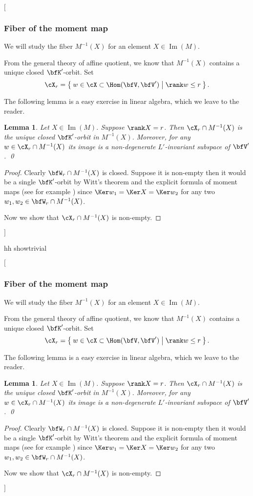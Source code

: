 \documentclass[12pt,a4paper]{amsart}
\newcommand{\trivial}[2][]{\if\relax\detokenize{#1}\relax
  {%
      \color{orange} \vspace{0em} $[$  #2 $]$
      \color{black}
  }
  \else
\ifx#1h
\ifcsname showtrivial\endcsname
{%
    \color{orange} \vspace{0em}  $[$ #2 $]$
    \color{black}
}
\fi
\else {\red Wrong argument!} \fi
\fi
}
\def\Im{\operatorname{Im}}
\numberwithin{equation}{section}
\newtheorem{lem}[thm]{Lemma}
\theoremstyle{remark}
\def\MMP{M}
\begin{document}
\trivial[h]{
\subsubsection{Fiber of the moment map}\label{sec:F.M}

We will study the fiber $M^{-1}(X)$ for an element $X\in \Im(M)$. %

From the general theory of affine quotient, we know that
  $M^{-1}(X)$ contains a unique closed $\bfK'$-orbit.
Set
\[
\cX_r = \Set{w\in \cX\subset \Hom(\bfV,\bfV')| \rank w\leq r}.
\]

The following lemma is a easy exercise in linear algebra, which we leave to the reader.
\begin{lem}\label{lem:F.cl}
Let $X\in\Im(\MMP)$. Suppose $\rank X = r$.
Then $\cX_r\cap \MMP^{-1}(X)$ is the unique closed $\bfK'$-orbit in $\MMP^{-1}(X)$.
Moreover, for any $w\in \cX_r\cap \MMP^{-1}(X)$ its image is a non-degenerate
$L'$-invariant subspace of $\bfV'$. \qed
\end{lem}

\begin{proof}
  Clearly $\bfW_r\cap \MMP^{-1}(X)$ is closed. Suppose it is non-empty then it
  would be a single $\bfK'$-orbit by Witt's theorem \cite[3.7.1]{Howe95} and the
  explicit formula of moment maps (see for example \cite[Appendix A]{LM}) since
  $\Ker w_1 = \Ker X = \Ker w_2$ for any two $w_1, w_2 \in \bfW_r \cap \MMP^{-1}(X)$.

  Now we show that $\cX_r\cap \MMP^{-1}(X)$ is non-empty.


\end{proof}}
\end{document}

